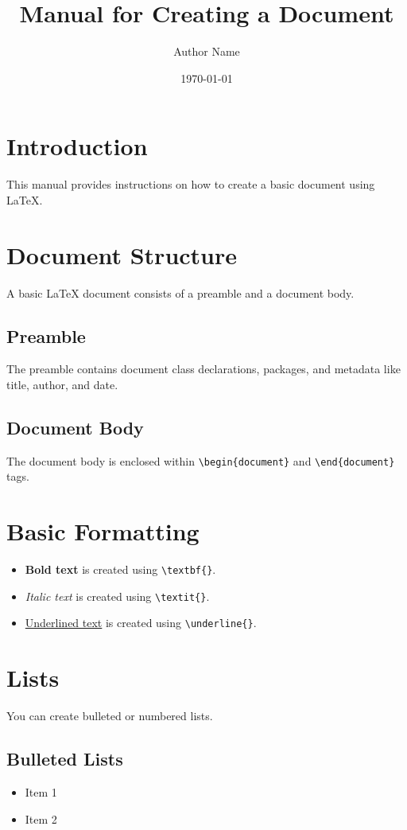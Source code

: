 \documentclass[12pt]{article}
\title{Manual for Creating a Document}
\author{Author Name}
\date{\today}
\begin{document}
\maketitle

\tableofcontents
\newpage

\section{Introduction}
This manual provides instructions on how to create a basic document using LaTeX.

\section{Document Structure}
A basic LaTeX document consists of a preamble and a document body.

\subsection{Preamble}
The preamble contains document class declarations, packages, and metadata like title, author, and date.

\subsection{Document Body}
The document body is enclosed within \texttt{\textbackslash begin\{document\}} and \texttt{\textbackslash end\{document\}} tags.

\section{Basic Formatting}
\begin{itemize}
    \item \textbf{Bold text} is created using \texttt{\textbackslash textbf\{\}}.
    \item \textit{Italic text} is created using \texttt{\textbackslash textit\{\}}.
    \item \underline{Underlined text} is created using \texttt{\textbackslash underline\{\}}.
\end{itemize}

\section{Lists}
You can create bulleted or numbered lists.

\subsection{Bulleted Lists}
\begin{itemize}
    \item Item 1
    \item Item 2
\end{itemize}
\end{document}
